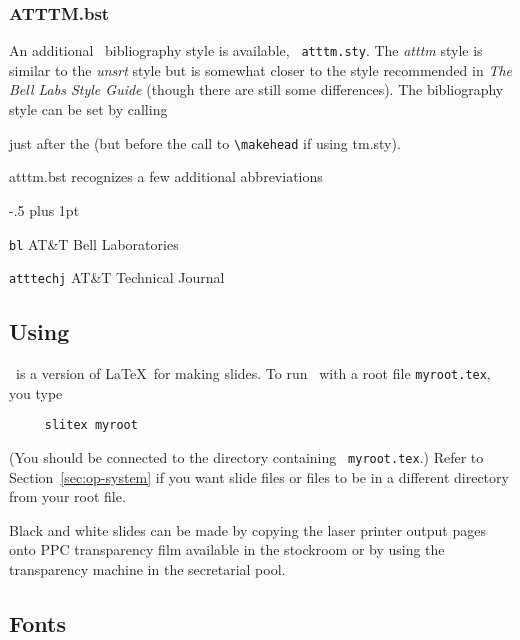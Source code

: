 
\subsubsection{ATTTM.bst}
An additional \BibTeX\ bibliography style is available, {\tt
atttm.sty}.  The {\it
atttm} style is similar to the {\it unsrt} style but is somewhat closer to
the style recommended in {\it The Bell Labs Style
Guide}\cite{bib:blstyle} (though there are still some differences).
The bibliography style can be set by calling
\begin{itemize}
\item[]
\verb|\verb|}|
\end{itemize}
just after the \verb|| (but before the call to
\verb|\makehead| if using tm.sty).

atttm.bst recognizes a few additional abbreviations
\begin{list}{}{ \itemindent-.5\leftmargin
       \itemsep=2pt plus 1pt
       \let\makelabel\descriptionlabel}\it
\item[\tt bl] AT\&T Bell Laboratories
\item[\tt atttechj] AT\&T Technical Journal
\end{list}

\subsection{Using \SLiTeX}

\SLiTeX\ is a version of \LaTeX\ for making slides.
To run \SLiTeX\  with a root file \mbox{\tt myroot.tex}, you type
\begin{verbatim}
     slitex myroot
\end{verbatim}
(You should be connected to the directory containing \mbox{\tt
myroot.tex}.) Refer to Section~\ref{sec:op-system} if you want slide
files or \hbox{\verb||} files to be in a different directory from
your root file.

Black and white slides can be made by copying the laser printer output
pages onto PPC transparency film available in the stockroom or by
using the transparency machine in the secretarial pool.

\subsection{Fonts}

